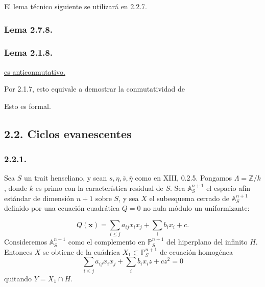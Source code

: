 El lema técnico siguiente se utilizará en 2.2.7.

  {\subsubsection*{Lema 2.7.8.}}
  {\subsubsection*{Lema 2.1.8.}}
\begin{center}
\footnotesize
{}
\end{center}
\underline{es anticonmutativo.}

Por 2.1.7, esto equivale a demostrar la conmutatividad de
\begin{center}
\end{center}
Esto es formal.

\subsection*{2.2. Ciclos evanescentes}

\subsubsection*{2.2.1.}
Sea $S$ un trait henseliano, y sean $s,\eta,\bar s,\bar\eta$ como en
XIII, 0.2.5. Pongamos $\Lambda=\mathbb Z/k$, donde $k$ es primo con
la característica residual de $S$. Sea $\mathbb A^{n+1}_S$ el espacio
afín estándar de dimensión $n+1$ sobre $S$, y sea $X$ el subesquema
cerrado de $\mathbb A^{n+1}_S$ definido por una ecuación cuadrática
$Q=0$ no nula módulo un uniformizante:

\pageoriginale

\[
Q(\underline{\mathbf x})=\sum_{i\leq j}a_{ij}x_ix_j+\sum_i b_ix_i+c.
\]
Consideremos $\mathbb A^{n+1}_S$ como el complemento en
$\mathbb P^{n+1}_S$ del hiperplano del infinito $H$. Entonces $X$ se
obtiene de la cuádrica $X_1\subset\mathbb P^{n+1}_S$ de ecuación
homogénea
\begin{equation}\tag{2.2.1.1}
\sum_{i\leq j}a_{ij}x_ix_j+\sum_i b_ix_iz+cz^2=0
\end{equation}
quitando $Y=X_1\cap H$.

